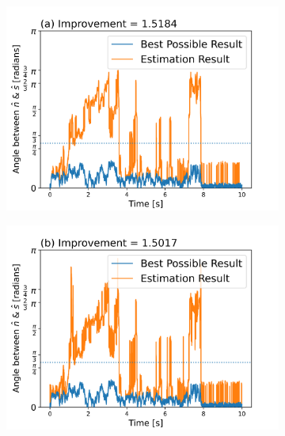 \documentclass[final,  3p]{elsarticle}
\begin{document}
\begin{figure}[h]
	
	\centering
	\begin{subfigure}{0.32\textwidth}
		\includegraphics[width=\textwidth]{./Images/fig6a.png}
	\end{subfigure}
	\begin{subfigure}{0.32\textwidth}
		\includegraphics[width=\textwidth]{./Images/fig6b.png}
	\end{subfigure}
	\begin{subfigure}{0.32\textwidth}

\end{subfigure}
\end{figure}
\end{document}
